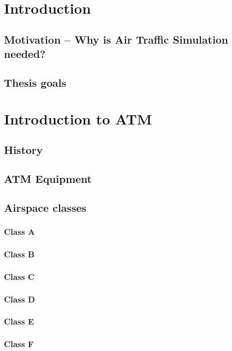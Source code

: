 \chapter{Introduction}

\section{Motivation – Why is Air Traffic Simulation needed?}
\section{Thesis goals}





\chapter{Introduction to ATM}

\section{History}

\section{ATM Equipment}

\section{Airspace classes}
\subsection{Class A}
\subsection{Class B}
\subsection{Class C}
\subsection{Class D}
\subsection{Class E}
\subsection{Class F}
